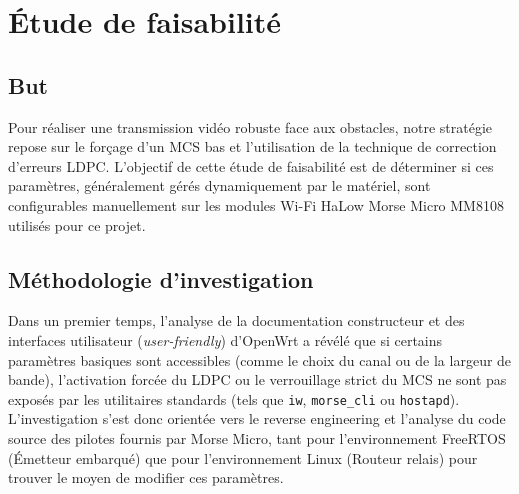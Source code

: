 \section{Étude de faisabilité}

\subsection{But}
Pour réaliser une transmission vidéo robuste face aux obstacles, notre stratégie repose sur le forçage 
d'un MCS bas et l'utilisation de la technique de correction d'erreurs LDPC. 
L'objectif de cette étude de faisabilité est de déterminer si ces paramètres, généralement gérés 
dynamiquement par le matériel, sont configurables manuellement sur les modules Wi-Fi HaLow Morse 
Micro MM8108 utilisés pour ce projet.

\subsection{Méthodologie d'investigation}
Dans un premier temps, l'analyse de la documentation constructeur et des interfaces utilisateur 
(\textit{user-friendly}) d'OpenWrt a révélé que si certains paramètres basiques 
sont accessibles (comme le choix du canal ou de la largeur de bande), l'activation forcée du LDPC 
ou le verrouillage strict du MCS ne sont pas exposés par les utilitaires standards 
(tels que \texttt{iw}, \texttt{morse\_cli} ou \texttt{hostapd}). L'investigation s'est donc orientée 
vers le reverse engineering et l'analyse du code source des pilotes fournis par Morse Micro, tant pour 
l'environnement FreeRTOS (Émetteur embarqué) que pour l'environnement Linux (Routeur relais) pour trouver
le moyen de modifier ces paramètres.

